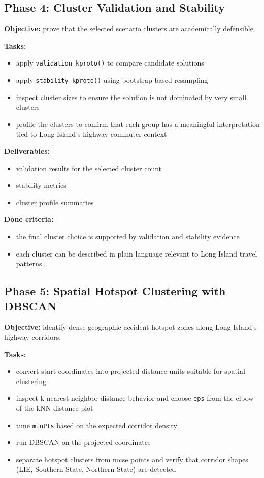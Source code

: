 \documentclass[11pt]{article}
\begin{document}
\subsection{Phase 4: Cluster Validation and Stability}

\textbf{Objective:} prove that the selected scenario clusters are academically defensible.

\textbf{Tasks:}
\begin{itemize}
\item apply \texttt{validation\_kproto()} to compare candidate solutions
\item apply \texttt{stability\_kproto()} using bootstrap-based resampling
\item inspect cluster sizes to ensure the solution is not dominated by very small clusters
\item profile the clusters to confirm that each group has a meaningful interpretation tied to Long Island's highway commuter context
\end{itemize}

\textbf{Deliverables:}
\begin{itemize}
\item validation results for the selected cluster count
\item stability metrics
\item cluster profile summaries
\end{itemize}

\textbf{Done criteria:}
\begin{itemize}
\item the final cluster choice is supported by validation and stability evidence
\item each cluster can be described in plain language relevant to Long Island travel patterns
\end{itemize}

\subsection{Phase 5: Spatial Hotspot Clustering with DBSCAN}

\textbf{Objective:} identify dense geographic accident hotspot zones along Long Island's highway corridors.

\textbf{Tasks:}
\begin{itemize}
\item convert start coordinates into projected distance units suitable for spatial clustering
\item inspect k-nearest-neighbor distance behavior and choose \texttt{eps} from the elbow of the kNN distance plot
\item tune \texttt{minPts} based on the expected corridor density
\item run DBSCAN on the projected coordinates
\item separate hotspot clusters from noise points and verify that corridor shapes (LIE, Southern State, Northern State) are detected
\end{itemize}
\end{document}
